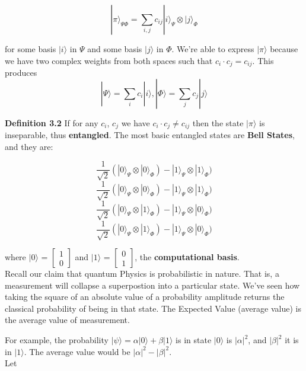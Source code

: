 \documentclass[letterpaper, 10 pt, conference]{ieeeconf}
\begin{document}
\[
|\pi\rangle_{\Psi\Phi} = 
\sum_{i, j} c_{ij} |i\rangle_{\Psi} \otimes |j\rangle_{\Phi}
\]

for some basis \( |i\rangle \) in \( \Psi \) and some basis \( |j\rangle \) in \( \Phi \).  We're able to express \( |\pi\rangle \) because we have two complex weights from both spaces such that \( c_i \cdot c_j = c_{ij} \).  This produces \\

\[
|\Psi\rangle = \sum_{i} c_i |i\rangle,
|\Phi\rangle = \sum_{j} c_j |j\rangle
\]

\textbf{Definition 3.2} If for any \( c_i \), \( c_j \) we have \( c_i \cdot c_j \neq c_{ij} \) then the state \( |\pi\rangle \) is inseparable, thus \textbf{entangled}.  The most basic entangled states are \textbf{Bell States}, and they are:

\[
\frac{1}{\sqrt2}(|0\rangle_{\Psi} \otimes |0\rangle_{\Phi}) - |1\rangle_{\Psi} \otimes |1\rangle_{\Phi})
\]
\[
\frac{1}{\sqrt2}(|0\rangle_{\Psi} \otimes |0\rangle_{\Phi}) - |1\rangle_{\Psi} \otimes |1\rangle_{\Phi})
\]
\[
\frac{1}{\sqrt2}(|0\rangle_{\Psi} \otimes |1\rangle_{\Phi}) - |1\rangle_{\Psi} \otimes |0\rangle_{\Phi})
\]
\[
\frac{1}{\sqrt2}(|0\rangle_{\Psi} \otimes |1\rangle_{\Phi}) - |1\rangle_{\Psi} \otimes |0\rangle_{\Phi})
\]

where \( |0\rangle \) = \( \begin{bmatrix} 1 \\ 0 \end{bmatrix} \) and \( |1\rangle \) = \( \begin{bmatrix} 0 \\ 1 \end{bmatrix} \), the \textbf{computational basis}.
\\

Recall our claim that quantum Physics is probabilistic in nature.  That is, a measurement will collapse a superpostion into a particular state.  We've seen how taking the square of an absolute value of a probability amplitude returns the classical probability of being in that state.  The Expected Value (average value) is the average value of measurement.

For example, the probability \( |\psi\rangle = \alpha|0\rangle + \beta|1\rangle \) is in state \( |0\rangle \) is \( |\alpha|^2 \), and \( |\beta|^2 \) it is in \( |1\rangle \).  The average value would be \( |\alpha|^2 - |\beta|^2 \). \\

Let
\end{document}
